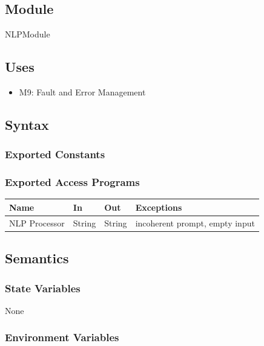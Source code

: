 \documentclass[12pt, titlepage]{article}
\begin{document}
\subsection{Module}

NLPModule

\subsection{Uses}

\begin{itemize}
    \item M9: Fault and Error Management
\end{itemize}

\subsection{Syntax}

\subsubsection{Exported Constants}

\par

\subsubsection{Exported Access Programs}

\begin{center}
\begin{tabularx}{\textwidth}{l l l X}
\toprule
\textbf{Name} & \textbf{In} & \textbf{Out} & \textbf{Exceptions} \\
\midrule
NLP Processor & String & String & incoherent prompt, empty input \\
\bottomrule
\end{tabularx}
\end{center}

\subsection{Semantics}

\subsubsection{State Variables}

\par{None}

\subsubsection{Environment Variables}
\end{document}
